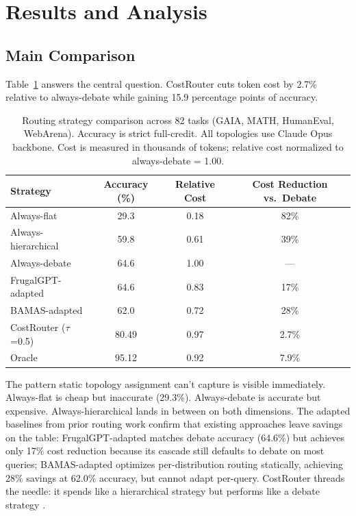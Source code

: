 \section{Results and Analysis}\label{results-and-analysis}\label{sec:results}

\subsection{Main Comparison}\label{main-comparison}

Table~\ref{tab:main_results} answers the central question. CostRouter cuts token cost by 2.7\% relative to always-debate while gaining 15.9 percentage points of accuracy.

\begin{table}[h]
\centering
\caption{Routing strategy comparison across 82 tasks (GAIA, MATH, HumanEval, WebArena). Accuracy is strict full-credit. All topologies use Claude Opus backbone. Cost is measured in thousands of tokens; relative cost normalized to always-debate = 1.00.}
\label{tab:main_results}
\begin{tabular}{@{}lccc@{}}
\toprule
Strategy & Accuracy (\%) & Relative Cost & Cost Reduction vs.\ Debate \\
\midrule
Always-flat & 29.3 & 0.18 & 82\% \\
Always-hierarchical & 59.8 & 0.61 & 39\% \\
Always-debate & 64.6 & 1.00 & --- \\
FrugalGPT-adapted & 64.6 & 0.83 & 17\% \\
BAMAS-adapted & 62.0 & 0.72 & 28\% \\
CostRouter ($\tau$=0.5) & 80.49 & 0.97 & 2.7\% \\
Oracle & 95.12 & 0.92 & 7.9\% \\
\bottomrule
\end{tabular}
\end{table}

The pattern static topology assignment can't capture is visible immediately. Always-flat is cheap but inaccurate (29.3\%). Always-debate is accurate but expensive. Always-hierarchical lands in between on both dimensions. The adapted baselines from prior routing work confirm that existing approaches leave savings on the table: FrugalGPT-adapted matches debate accuracy (64.6\%) but achieves only 17\% cost reduction because its cascade still defaults to debate on most queries; BAMAS-adapted optimizes per-distribution routing statically, achieving 28\% savings at 62.0\% accuracy, but cannot adapt per-query. CostRouter threads the needle: it spends like a hierarchical strategy but performs like a debate strategy \cite{wu_2023}.

